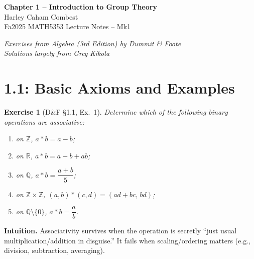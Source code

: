 \documentclass[12pt]{article}
\newtheorem{exercise}[theorem]{Exercise}
\theoremstyle{definition}
\begin{document}
\begin{center}
\Large\textbf{ Chapter 1 – Introduction to Group Theory} \\
\large Harley Caham Combest \\
\large Fa2025 MATH5353 Lecture Notes – Mk1
\end{center}
\large \textit{Exercises from Algebra (3rd Edition) by Dummit \& Foote}\\
\large \textit{Solutions largely from Greg Kikola}\\

\newpage

\dotfill
\section*{1.1: Basic Axioms and Examples}
\dotfill

\newpage

\begin{exercise}[D\&F §1.1, Ex.~1]
Determine which of the following binary operations are associative:
\begin{enumerate}
\item on $\mathbb{Z}$, $a*b=a-b$;
\item on $\mathbb{R}$, $a*b=a+b+ab$;
\item on $\mathbb{Q}$, $a*b=\dfrac{a+b}{5}$;
\item on $\mathbb{Z}\times\mathbb{Z}$, $(a,b)*(c,d)=(ad+bc,\,bd)$;
\item on $\mathbb{Q}\setminus\{0\}$, $a*b=\dfrac{a}{b}$.
\end{enumerate}
\end{exercise}

\dotfill

\noindent
\textbf{Intuition.} Associativity survives when the operation is secretly “just usual multiplication/addition in disguise.” It fails when scaling/ordering matters (e.g., division, subtraction, averaging).

\dotfill
\end{document}
